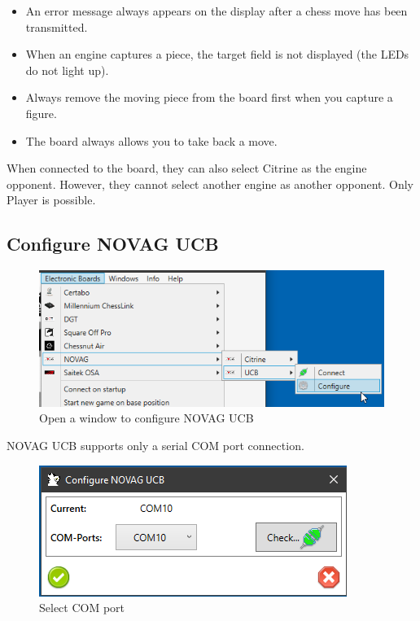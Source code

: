 \documentclass[11pt,a4paper]{article}
\begin{document}
\begin{itemize}
	\item An error message always appears on the display after a chess move has been transmitted.
	\item When an engine captures a piece, the target field is not displayed (the LEDs do not light up).
	\item Always remove the moving piece from the board first when you capture a figure.
	\item The board always allows you to take back a move.
\end{itemize}

When connected to the board, they can also select Citrine as the engine opponent.
However, they cannot select another engine as another opponent. Only Player is possible.

\subsection{Configure NOVAG UCB} \label{ConfigureNovagUCB}

\begin{figure}[H]
	\centering
	\includegraphics[scale=0.8]{NovagUCB1.png}
	\caption{Open a window to configure NOVAG UCB}
	\label{fig:NovagUCB1}
\end{figure}

NOVAG UCB supports only a serial COM port connection.

\begin{figure}[H]
	\centering
	\includegraphics[scale=1.0]{NovagUCB2.png}
	\caption{Select COM port}
	\label{fig:NovagUCB2}
\end{figure}
\end{document}
